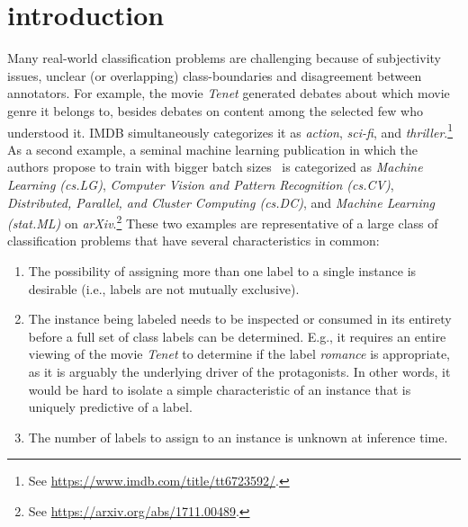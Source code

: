 
\section{introduction}
\label{sec:org662677c}


Many real-world classification problems are challenging because of subjectivity issues, unclear (or overlapping) class-boundaries and disagreement between annotators. 
For example, the movie \textit{Tenet} generated debates about which movie genre it belongs to, besides debates on content among the selected few who understood it. IMDB simultaneously categorizes it as \textit{action}, \textit{sci-fi}, and \textit{thriller}.\footnote{See \url{https://www.imdb.com/title/tt6723592/}.} 
As a second example, a seminal machine learning publication in which the authors propose to train with bigger batch sizes~\citep{bigBSArxiv} is categorized as \textit{Machine Learning (cs.LG)},
\textit{Computer Vision and Pattern Recognition (cs.CV)}, \textit{Distributed,
Parallel, and Cluster Computing (cs.DC)}, and \textit{Machine Learning
(stat.ML)} on \textit{arXiv}.\footnote{See \url{https://arxiv.org/abs/1711.00489}.}
These two examples are representative of a large class of classification problems that have several characteristics in common: 
\begin{enumerate}[label=(\arabic*),leftmargin=*]
\item The possibility of assigning more than one label to a single instance is desirable (i.e., labels are not mutually exclusive). 
\item The instance being labeled needs to be inspected or consumed in its entirety before a full set of class labels can be determined. E.g., it requires an entire viewing of the movie \textit{Tenet} to determine if the label \textit{romance} is appropriate, as it is arguably the underlying driver of the protagonists. In other words, it would be hard to isolate a simple characteristic of an instance that is uniquely predictive of a label.
\item The number of labels to assign to an instance is unknown at inference time.
\end{enumerate}

